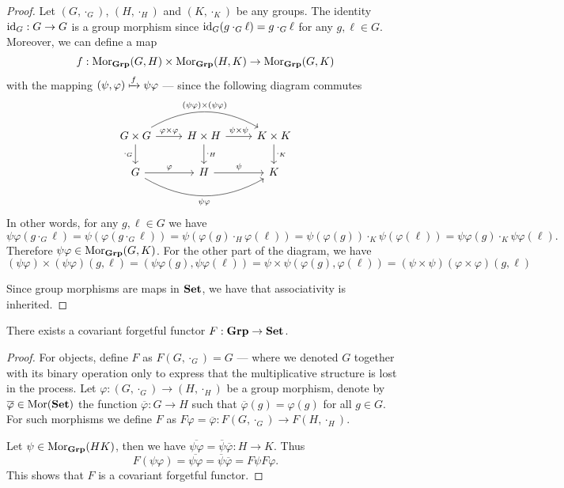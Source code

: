 \begin{proof}
Let \((G, \cdot_G)\), \((H, \cdot_H)\) and \((K, \cdot_K)\) be any
groups. The identity \(\operatorname{id}_G: G \to G\) is a group morphism since \(\operatorname{id}_G(g
\cdot_G \ell) = g \cdot_G \ell\) for any \(g, \ell \in G\). Moreover,
we can define a map
\[
  f: \operatorname{Mor}_{{\textbf{Grp}}}(G, H) \times \operatorname{Mor}_{{\textbf{Grp}}}(H, K) \to \operatorname{Mor}_{{\textbf{Grp}}}(G, K)
\]
with the mapping \((\psi, \varphi) \xmapsto f \psi \varphi\) --- since
the following diagram commutes
\[
  \begin{tikzcd}
    G \times G \ar[r, "\varphi \times \varphi"]
    \ar[d, swap, "\cdot_G"]
    \ar[rr, bend left, "(\psi \varphi) \times (\psi \varphi)"]
    &H \times H \ar[r, "\psi \times \psi"]
    \ar[d, "\cdot_H"]
    &K \times K \ar[d, "\cdot_K"]
    \\
    G \ar[r, "\varphi"]
    \ar[rr, bend right, swap, "\psi \varphi"]
    &H \ar[r, "\psi"] &K
  \end{tikzcd}
\]
In other words, for any \(g, \ell \in G\) we have
\[
  \psi \varphi (g \cdot_G \ell)
  = \psi(\varphi(g \cdot_G \ell))
  = \psi(\varphi(g) \cdot_H \varphi(\ell))
  = \psi(\varphi(g)) \cdot_K \psi(\varphi(\ell))
  = \psi \varphi(g) \cdot_K \psi \varphi(\ell).
\]
Therefore \(\psi \varphi \in \operatorname{Mor}_{\textbf{Grp}}(G, K)\). For the other part of the
diagram, we have
\[
  (\psi \varphi) \times (\psi \varphi) (g, \ell)
  = (\psi \varphi(g), \psi \varphi(\ell))
  = \psi \times \psi(\varphi(g), \varphi(\ell))
  = (\psi \times \psi) (\varphi \times \varphi) (g, \ell)
\]

Since group morphisms are maps in \({\textbf{Set}}\), we have that associativity is
inherited.
\end{proof}

\begin{proposition}\label{prop: forgetful-func-grp-set}
There exists a covariant forgetful functor \(F: {\textbf{Grp}} \to {\textbf{Set}}\).
\end{proposition}

\begin{proof}
For objects, define \(F\) as \(F(G, \cdot_G) = G\) --- where we denoted \(G\)
together with its binary operation only to express that the multiplicative
structure is lost in the process. Let \(\varphi: (G, \cdot_G) \to (H, \cdot_H)\)
be a group morphism, denote by \(\overline \varphi \in \operatorname{Mor}({\textbf{Set}})\) the function
\(\overline\varphi: G \to H\) such that \(\overline\varphi(g) = \varphi(g)\) for
all \(g \in G\). For such morphisms we define \(F\) as \(F\varphi =
\overline\varphi: F(G, \cdot_G) \to F(H, \cdot_H)\).

Let \(\psi \in \operatorname{Mor}_{\textbf{Grp}}(H K)\), then we have
\(\overline{\psi \varphi} = \overline \psi \overline \varphi: H \to K\). Thus
\[
  F(\psi \varphi) = \overline{\psi \varphi}
  = \overline \psi \overline \varphi = F\psi F\varphi.
\]
This shows that \(F\) is a covariant forgetful functor.
\end{proof}

